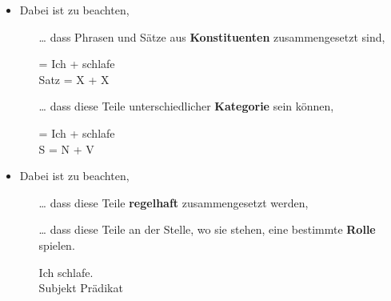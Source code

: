 \begin{frame}

\begin{itemize}
\item Dabei ist zu beachten, 

\begin{itemize}
	\item [\dots] dass Phrasen und Sätze aus \textbf{Konstituenten} zusammengesetzt sind,

	\ea
	 = Ich + schlafe\\
	Satz = X + X \\
	\z

\pause

	\item [\dots] dass diese Teile unterschiedlicher \textbf{Kategorie} sein können,

	\ea 
	 = Ich + schlafe\\
	S = N + V \\
	\z

\end{itemize}

\end{itemize}

\end{frame}


\begin{frame}

\begin{itemize}
\item Dabei ist zu beachten, 

\begin{itemize}

	\item [\dots] dass diese Teile \textbf{regelhaft} zusammengesetzt werden,

	\eal 
	\zl

\pause

	\item [\dots] dass diese Teile an der Stelle, wo sie stehen, eine bestimmte \textbf{Rolle} spielen.
			
	\ea
	\gll Ich schlafe.\\
	Subjekt Prädikat\\
	\z
	
\end{itemize}

\end{itemize}

\end{frame}


